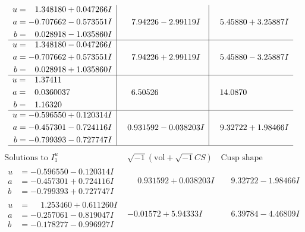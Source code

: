 \documentclass[1p]{elsarticle_modified}
\theoremstyle{definition}
\newcommand{\I}{\sqrt{-1}}
\begin{document}
$$\begin{array}{c|c|c}
\begin{aligned}
u &= \phantom{-}1.348180 + 0.047266 I \\
a &= -0.707662 - 0.573551 I \\
b &= \phantom{-}0.028918 - 1.035860 I\end{aligned}
 & \phantom{-}7.94226 - 2.99119 I & \phantom{-}5.45880 + 3.25887 I \\ \hline\begin{aligned}
u &= \phantom{-}1.348180 - 0.047266 I \\
a &= -0.707662 + 0.573551 I \\
b &= \phantom{-}0.028918 + 1.035860 I\end{aligned}
 & \phantom{-}7.94226 + 2.99119 I & \phantom{-}5.45880 - 3.25887 I \\ \hline\begin{aligned}
u &= \phantom{-}1.37411\phantom{ +0.000000I} \\
a &= \phantom{-}0.0360037\phantom{ +0.000000I} \\
b &= \phantom{-}1.16320\phantom{ +0.000000I}\end{aligned}
 & \phantom{-}6.50526\phantom{ +0.000000I} & \phantom{-}14.0870\phantom{ +0.000000I} \\ \hline\begin{aligned}
u &= -0.596550 + 0.120314 I \\
a &= -0.457301 - 0.724116 I \\
b &= -0.799393 - 0.727747 I\end{aligned}
 & \phantom{-}0.931592 - 0.038203 I & \phantom{-}9.32722 + 1.98466 I\\
 \hline 
 \end{array}$$\newpage$$\begin{array}{c|c|c}  
\text{Solutions to }I^u_{1}& \I (\text{vol} + \sqrt{-1}CS) & \text{Cusp shape}\\
 \hline 
\begin{aligned}
u &= -0.596550 - 0.120314 I \\
a &= -0.457301 + 0.724116 I \\
b &= -0.799393 + 0.727747 I\end{aligned}
 & \phantom{-}0.931592 + 0.038203 I & \phantom{-}9.32722 - 1.98466 I \\ \hline\begin{aligned}
u &= \phantom{-}1.253460 + 0.611260 I \\
a &= -0.257061 - 0.819047 I \\
b &= -0.178277 - 0.996927 I\end{aligned}
 & -0.01572 + 5.94333 I & \phantom{-}6.39784 - 4.46809 I \\ \hline\begin{aligned}

\end{aligned}
\end{array}$$
\end{document}
